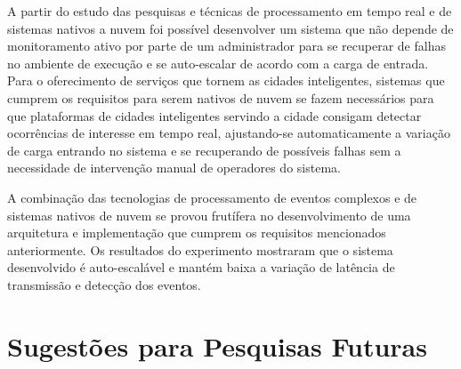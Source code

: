 A partir do estudo das pesquisas e técnicas de processamento em tempo real e de sistemas nativos a nuvem foi possível desenvolver um sistema que não depende de monitoramento ativo por parte de um administrador para se recuperar de falhas no ambiente de execução e se auto-escalar de acordo com a carga de entrada. Para o oferecimento de serviços que tornem as cidades inteligentes, sistemas que cumprem os requisitos para serem nativos de nuvem se fazem necessários para que plataformas de cidades inteligentes servindo a cidade consigam detectar ocorrências de interesse em tempo real, ajustando-se automaticamente a variação de carga entrando no sistema e se recuperando de possíveis falhas sem a necessidade de intervenção manual de operadores do sistema.



A combinação das tecnologias de processamento de eventos complexos e de sistemas nativos de nuvem se provou frutífera no desenvolvimento de uma arquitetura e implementação que cumprem os requisitos mencionados anteriormente. 
Os resultados do experimento mostraram que o sistema desenvolvido é auto-escalável e mantém baixa a variação de latência de transmissão e detecção dos eventos.












\section{Sugestões para Pesquisas Futuras} 

